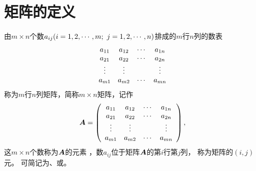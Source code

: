\section{矩阵的定义}
\begin{dingyi}
  由$m\times n$个数$a_{ij}(i=1,2,\cdots,m; \ j = 1, 2, \cdots, n)$排成的$m$行$n$列的数表
  $$
  \begin{array}{cccc}
    a_{11} & a_{12} & \cdots & a_{1n}\\
    a_{21} & a_{22} & \cdots & a_{2n}\\
    \vdots    & \vdots   &     & \vdots \\
    a_{m1} & a_{m2} & \cdots & a_{mn}\\
  \end{array}
  $$
  称为$m$行$n$列矩阵，简称$m \times n$矩阵，记作
  $$
  {\boldsymbol{A}} = \left(
    \begin{array}{cccc}
      a_{11} & a_{12} & \cdots & a_{1n}\\
      a_{21} & a_{22} & \cdots & a_{2n}\\
      \vdots    & \vdots   &     & \vdots \\
      a_{m1} & a_{m2} & \cdots & a_{mn}\\
    \end{array}
  \right),
  $$
  这$m \times n$个数称为$\boldsymbol{A}$的元素
  ，数$a_{ij}$位于矩阵$\boldsymbol{A}$的第$i$行第$j$列，
  称为矩阵的$(i,j)$元。 可简记为、或。
\end{dingyi}

